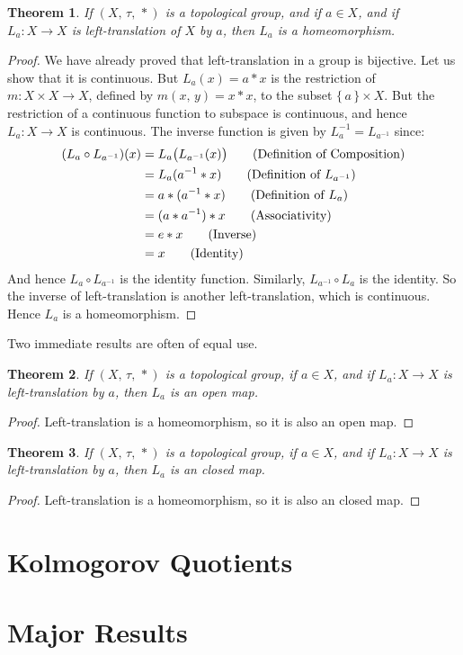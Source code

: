 \documentclass{article}
\theoremstyle{plain}
\newtheorem{theorem}{Theorem}[section]
\theoremstyle{normal}
\begin{document}
        \begin{theorem}
            If $(X,\,\tau,\,*)$ is a topological group, and if $a\in{X}$,
            and if $L_{a}:X\rightarrow{X}$ is left-translation of $X$ by $a$,
            then $L_{a}$ is a homeomorphism.
        \end{theorem}
        \begin{proof}
            We have already proved that left-translation in a group is
            bijective. Let us show that it is continuous. But
            $L_{a}(x)=a*x$ is the restriction of
            $m:X\times{X}\rightarrow{X}$, defined by $m(x,\,y)=x*x$, to the
            subset $\{\,a\,\}\times{X}$. But the restriction of a continuous
            function to subspace is continuous, and hence
            $L_{a}:X\rightarrow{X}$ is continuous. The inverse function
            is given by $L_{a}^{-1}=L_{a^{-1}}$ since:
            \begin{align}
                (L_{a}\circ{L}_{a^{-1}})(x)
                &=L_{a}\big(L_{a^{-1}}(x)\big)\tag{Definition of Composition}\\
                &=L_{a}(a^{-1}*x)\tag{Definition of $L_{a^{-1}}$}\\
                &=a*(a^{-1}*x)\tag{Definition of $L_{a}$}\\
                &=(a*a^{-1})*x\tag{Associativity}\\
                &=e*x\tag{Inverse}\\
                &=x\tag{Identity}
            \end{align}
            And hence $L_{a}\circ{L}_{a^{-1}}$ is the identity function.
            Similarly, $L_{a^{-1}}\circ{L}_{a}$ is the identity. So the
            inverse of left-translation is another left-translation, which is
            continuous. Hence $L_{a}$ is a homeomorphism.
        \end{proof}
        Two immediate results are often of equal use.
        \begin{theorem}
            If $(X,\,\tau,\,*)$ is a topological group, if $a\in{X}$, and if
            $L_{a}:X\rightarrow{X}$ is left-translation by $a$, then
            $L_{a}$ is an open map.
        \end{theorem}
        \begin{proof}
            Left-translation is a homeomorphism, so it is also an open map.
        \end{proof}
        \begin{theorem}
            If $(X,\,\tau,\,*)$ is a topological group, if $a\in{X}$, and if
            $L_{a}:X\rightarrow{X}$ is left-translation by $a$, then
            $L_{a}$ is an closed map.
        \end{theorem}
        \begin{proof}
            Left-translation is a homeomorphism, so it is also an closed map.
        \end{proof}
    \section{Kolmogorov Quotients}
    \section{Major Results}
\end{document}
